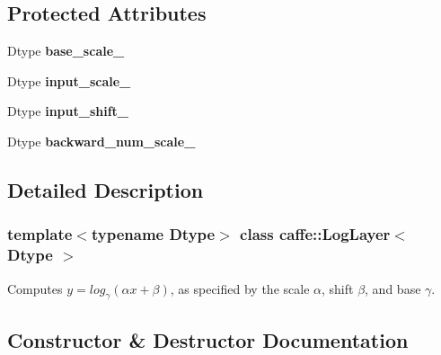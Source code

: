 \subsection*{Protected Attributes}
\begin{DoxyCompactItemize}
\item 
\mbox{\label{classcaffe_1_1_log_layer_a491b3c774d06e7444e098f5e92116473}} 
Dtype {\bfseries base\+\_\+scale\+\_\+}
\item 
\mbox{\label{classcaffe_1_1_log_layer_a8c45b84ac085d9422655e68c107aa38f}} 
Dtype {\bfseries input\+\_\+scale\+\_\+}
\item 
\mbox{\label{classcaffe_1_1_log_layer_aea8ff4c75c4d1332801b91af479916af}} 
Dtype {\bfseries input\+\_\+shift\+\_\+}
\item 
\mbox{\label{classcaffe_1_1_log_layer_ab87303089b3708884efaabef8a5e0df2}} 
Dtype {\bfseries backward\+\_\+num\+\_\+scale\+\_\+}
\end{DoxyCompactItemize}


\subsection{Detailed Description}
\subsubsection*{template$<$typename Dtype$>$\newline
class caffe\+::\+Log\+Layer$<$ Dtype $>$}

Computes $ y = log_{\gamma}(\alpha x + \beta) $, as specified by the scale $ \alpha $, shift $ \beta $, and base $ \gamma $. 

\subsection{Constructor \& Destructor Documentation}
\mbox{\label{classcaffe_1_1_log_layer_aa6f92a0b12140d70a44a2bcb71bab552}} 
